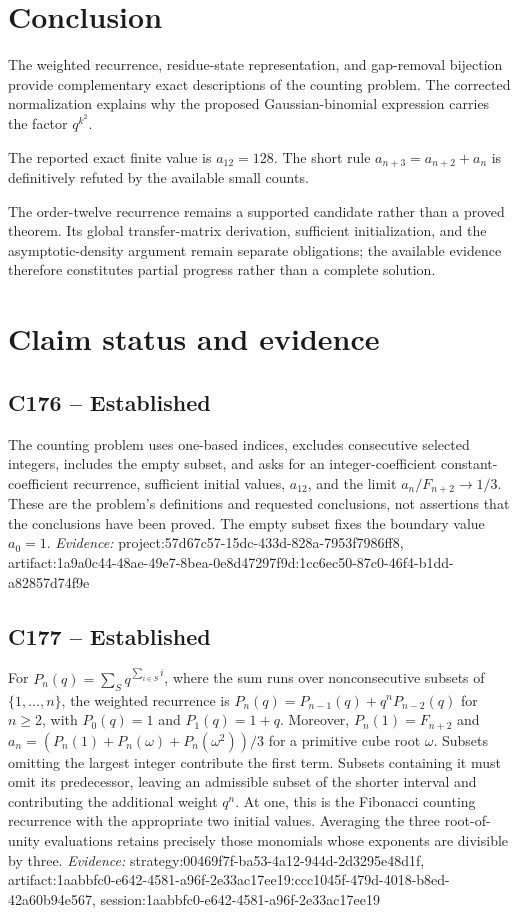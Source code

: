 \documentclass[11pt]{article}
\begin{document}
\section{Conclusion}
The weighted recurrence, residue-state representation, and gap-removal bijection provide complementary exact descriptions of the counting problem. The corrected normalization explains why the proposed Gaussian-binomial expression carries the factor $q^{k^2}$.

The reported exact finite value is $a_{12}=128$. The short rule $a_{n+3}=a_{n+2}+a_n$ is definitively refuted by the available small counts.

The order-twelve recurrence remains a supported candidate rather than a proved theorem. Its global transfer-matrix derivation, sufficient initialization, and the asymptotic-density argument remain separate obligations; the available evidence therefore constitutes partial progress rather than a complete solution.

\section*{Claim status and evidence}
\subsection{C176 -- Established}
The counting problem uses one-based indices, excludes consecutive selected integers, includes the empty subset, and asks for an integer-coefficient constant-coefficient recurrence, sufficient initial values, $a_{12}$, and the limit $a_n/F_{n+2}\to 1/3$.
These are the problem's definitions and requested conclusions, not assertions that the conclusions have been proved. The empty subset fixes the boundary value $a_0=1$.
\textit{Evidence: }project:57d67c57-15dc-433d-828a-7953f7986ff8, artifact:1a9a0c44-48ae-49e7-8bea-0e8d47297f9d:1cc6ec50-87c0-46f4-b1dd-a82857d74f9e
\subsection{C177 -- Established}
For $P_n(q)=\sum_S q^{\sum_{i\in S}i}$, where the sum runs over nonconsecutive subsets of $\{1,\ldots,n\}$, the weighted recurrence is $P_n(q)=P_{n-1}(q)+q^nP_{n-2}(q)$ for $n\geq2$, with $P_0(q)=1$ and $P_1(q)=1+q$. Moreover, $P_n(1)=F_{n+2}$ and $a_n=(P_n(1)+P_n(\omega)+P_n(\omega^2))/3$ for a primitive cube root $\omega$.
Subsets omitting the largest integer contribute the first term. Subsets containing it must omit its predecessor, leaving an admissible subset of the shorter interval and contributing the additional weight $q^n$. At one, this is the Fibonacci counting recurrence with the appropriate two initial values. Averaging the three root-of-unity evaluations retains precisely those monomials whose exponents are divisible by three.
\textit{Evidence: }strategy:00469f7f-ba53-4a12-944d-2d3295e48d1f, artifact:1aabbfc0-e642-4581-a96f-2e33ac17ee19:ccc1045f-479d-4018-b8ed-42a60b94e567, session:1aabbfc0-e642-4581-a96f-2e33ac17ee19
\end{document}
